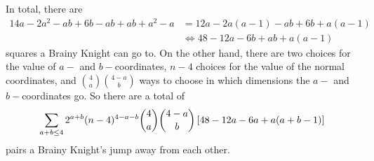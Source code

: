 \begin{solution}
    In total, there are 
    \begin{align*}
        14a - 2a^2 - ab + 6b - ab + ab + a^2 - a &= 12a - 2a(a - 1) - ab + 6b + a(a - 1) \\
        &\iff 48 - 12a - 6b + ab + a(a - 1)
    \end{align*}
    squares a Brainy Knight can go to. On the other hand, there are two choices for the value of 
    $a-$ and $b-$coordinates, $n - 4$ choices for the value of the normal coordinates, and $\binom{4}{a}\binom{4 - a}{b}$ 
    ways to choose in which dimensions the $a-$ and $b-$coordinates go. So there are a total of 
    $$\sum_{a + b \leq 4} 2^{a + b}(n - 4)^{4 - a - b}\dbinom{4}{a}\dbinom{4 - a}{b}\left[48 - 12a - 6a + a(a + b - 1)\right]$$ 
    pairs a Brainy Knight's jump away from each other. 
\end{solution}\bigskip
